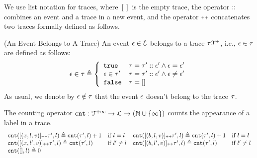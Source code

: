 We use list notation for traces, where $[]$ is the empty trace, the operator ${\small ::}$ combines an event and a trace in a new event, 
and the operator ${\scriptscriptstyle ++}$ concatenates two traces formally defined as follows. 
\begin{defn}(An Event Belongs to A Trace)
  An event $\mathtt{\epsilon} \in \mathcal{E}$ belongs to a trace $\mathtt{\tau} \mathcal{T}^{+}$, i.e., $\mathtt{\epsilon} \in \mathtt{\tau}$ are defined as follows:
%
\begin{equation*}
  \event \in \trace  
  \triangleq \left\{
  \begin{array}{ll} 
    \etrue                  & \trace =  \trace' :: \event'
     \land \event = \event' \\
    \event \in \trace' & \trace =  \trace' :: \event'
    \land \event \neq \event' \\ 
    \efalse                 & \trace = []
  \end{array}
  \right.
\end{equation*}
As usual, we denote by $\mathtt{\epsilon} \notin \mathtt{\tau}$ that the event $\mathtt{\epsilon}$ doesn't belong to the trace $\mathtt{\tau}$.
\end{defn}
%
\begin{defn}
  \label{def:counter}
The counting operator $\mathtt{cnt} : \mathcal{T}^{+\infty} \to \mathcal{L} \to (\mathbb{N} \cup \{\infty\})$
counts the appearance of a label in a trace.
\[
\begin{array}{llll}
\mathtt{cnt}([(x, l, v)] {\scriptscriptstyle ++} \mathtt{\tau}', l ) \triangleq \mathtt{cnt}(\mathtt{\tau}', l) + 1 & \text{if}~ l = l
&
\mathtt{cnt}([(b, l, v)] {\scriptscriptstyle ++} \mathtt{\tau}', l) \triangleq \mathtt{cnt}(\mathtt{\tau}', l) + 1 & \text{if}~ l = l
\\
\mathtt{cnt}([(x, l', v)] {\scriptscriptstyle ++} \mathtt{\tau}', l) \triangleq \mathtt{cnt}(\mathtt{\tau}', l)   & \text{if}~ l' \neq l
&
\mathtt{cnt}([(b, l', v)] {\scriptscriptstyle ++} \mathtt{\tau}', l) \triangleq \mathtt{cnt}(\mathtt{\tau}', l)   & \text{if}~ l' \neq l
\\
\mathtt{cnt}({[]}, l) \triangleq 0
\end{array}
\]
\end{defn}

